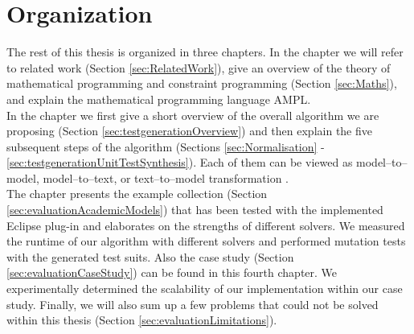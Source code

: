 \section{Organization}
The rest of this thesis is organized in three chapters. In the chapter  we will refer to related work (Section \ref{sec:RelatedWork}),%
give an overview of the theory of mathematical programming and constraint programming (Section \ref{sec:Maths}), and explain the mathematical programming language AMPL.\\
In the chapter  we first give a short overview of the overall algorithm we are proposing (Section \ref{sec:testgenerationOverview}) and then explain the five subsequent steps of the algorithm (Sections \ref{sec:Normalisation} - \ref{sec:testgenerationUnitTestSynthesis}). Each of them can be viewed as model--to--model, model--to--text, or text--to--model transformation . 
\\
The chapter  presents the example collection (Section \ref{sec:evaluationAcademicModels}) that has been tested with the implemented Eclipse plug-in and elaborates on the strengths of different solvers. We measured the runtime of our algorithm with different solvers and performed mutation tests with the generated test suits. Also the case study (Section \ref{sec:evaluationCaseStudy}) can be found in this fourth chapter. We experimentally determined the scalability of our implementation within our case study. Finally, we will also sum up a few problems that could not be solved within this thesis (Section \ref{sec:evaluationLimitations}).